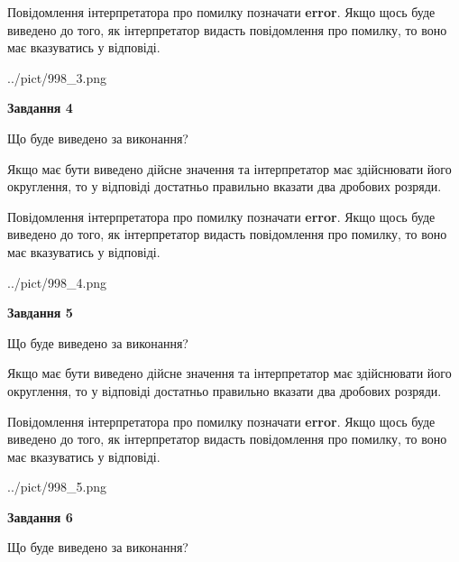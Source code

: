 \documentclass[12pt, ukrainian]{article}
\begin{document}
{\begin {Large}
Повідомлення інтерпретатора про помилку позначати \textbf{error}.
Якщо щось буде виведено до того, як інтерпретатор видасть повідомлення про помилку, 
то воно має вказуватись у відповіді. \par

\begin{center}
	{../pict/998_3.png}
\end{center}
\newpage

{\begin {center}\textbf{Завдання 4}\end {center}}\par
Що буде виведено за виконання? \par

Якщо має бути виведено дійсне значення та інтерпретатор має здійснювати його округлення, 
то у відповіді достатньо правильно вказати два дробових розряди.

Повідомлення інтерпретатора про помилку позначати \textbf{error}.
Якщо щось буде виведено до того, як інтерпретатор видасть повідомлення про помилку, 
то воно має вказуватись у відповіді. \par

\begin{center}
	{../pict/998_4.png}
\end{center}
\newpage

{\begin {center}\textbf{Завдання 5}\end {center}}\par
Що буде виведено за виконання? \par

Якщо має бути виведено дійсне значення та інтерпретатор має здійснювати його округлення, 
то у відповіді достатньо правильно вказати два дробових розряди.

Повідомлення інтерпретатора про помилку позначати \textbf{error}.
Якщо щось буде виведено до того, як інтерпретатор видасть повідомлення про помилку, 
то воно має вказуватись у відповіді. \par

\begin{center}
	{../pict/998_5.png}
\end{center}
\newpage

{\begin {center}\textbf{Завдання 6}\end {center}}\par
Що буде виведено за виконання? \par


\end{Large}}
\end{document}
